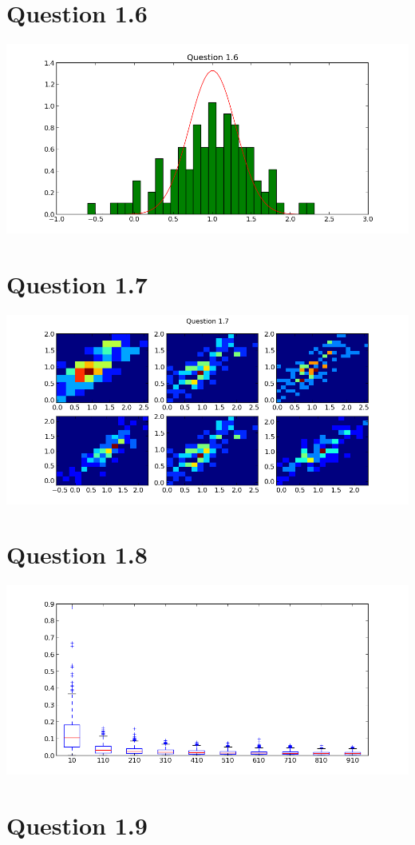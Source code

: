 \documentclass[11pt,a4paper]{article}
\begin{document}
\section{Question 1.6}
\includegraphics[scale=0.6]{figure_4.png}
\section{Question 1.7}
\includegraphics[scale=0.6]{figure_5.png}
\section{Question 1.8}
\includegraphics[scale=0.6]{figure_6.png}
\section{Question 1.9}
\end{document}
